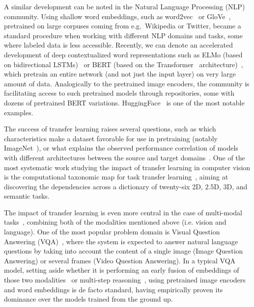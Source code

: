 A similar development can be noted in the Natural Language Processing (NLP) community.
Using shallow word embeddings, such as word2vec~\cite{mikolov2013distributed} or GloVe~\cite{pennington2014glove}, pretrained on large corpuses coming from e.g.\ Wikipedia or Twitter, became a standard procedure when working with different NLP domains and tasks, some where labeled data is less accessible.
Recently, we can denote an accelerated development of deep contextualized word representations such as ELMo (based on bidirectional LSTMs)~\cite{peters2018deep} or BERT (based on the Transformer~\cite{vaswani2017attention} architecture)~\cite{devlin2018bert}, which pretrain an entire network (and not just the input layer) on very large amount of data.
Analogically to the pretrained image encoders, the community is facilitating access to such pretrained models through repositories, some with dozens of pretrained BERT variations. HuggingFace~\cite{wolf2019transformers} is one of the most notable examples.

The success of transfer learning raises several questions, such as which characteristics make a dataset favorable for use in pretraining (notably ImageNet~\cite{huh2016makes}), or what explains the observed performance correlation of models with different architectures between the source and target domains~\cite{kornblith2019better}.
One of the most systematic work studying the impact of transfer learning in computer vision is the computational taxonomic map for task transfer learning~\cite{zamir2018taskonomy}, aiming at discovering the dependencies across a dictionary of twenty-six 2D, 2.5D, 3D, and semantic tasks.

The impact of transfer learning is even more central in the case of multi-modal tasks~\cite{mogadala2019trends}, combining both of the modalities mentioned above (i.e. vision and language).
One of the most popular problem domain is Visual Question Answering (VQA)~\cite{malinowski2014multi,antol2015vqa}, where the system is expected to answer natural language questions by taking into account the content of a single image (Image Question Answering) or several frames (Video Question Answering).
In a typical VQA model, setting aside whether it is performing an early fusion of embeddings of those two modalities~\cite{malinowski2018visual} or multi-step reasoning~\cite{hudson2018compositional}, using pretrained image encoders and word embeddings is de facto standard, having empirically proven its dominance over the models trained from the ground up.

